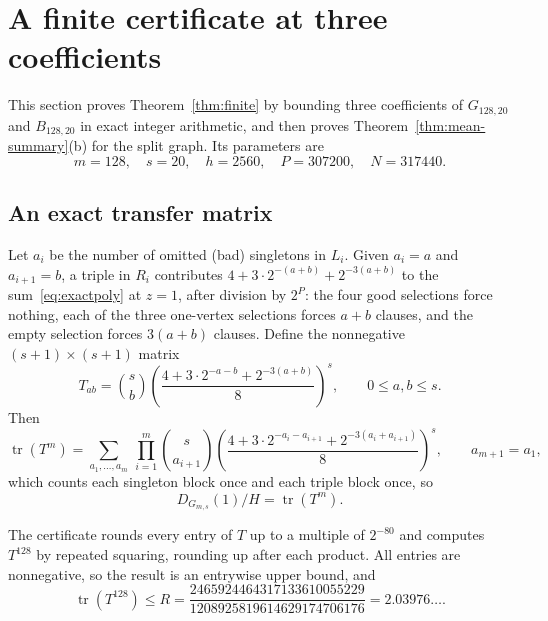 \documentclass[11pt,a4paper]{article}
\theoremstyle{definition}
\theoremstyle{remark}
\newcommand{\tr}{\operatorname{tr}}
\begin{document}
\section{A finite certificate at three coefficients}\label{sec:certificate}
This section proves Theorem~\ref{thm:finite} by bounding three coefficients of $G_{128,20}$ and $B_{128,20}$ in exact integer arithmetic, and then proves Theorem~\ref{thm:mean-summary}(b) for the split graph. Its parameters are
\[
m=128,\quad s=20,\quad h=2560,\quad P=307200,\quad N=317440.
\]

\subsection{An exact transfer matrix}
Let $a_i$ be the number of omitted (bad) singletons in $L_i$. Given $a_i=a$ and $a_{i+1}=b$, a triple in $R_i$ contributes $4+3\cdot2^{-(a+b)}+2^{-3(a+b)}$ to the sum~\eqref{eq:exactpoly} at $z=1$, after division by $2^P$: the four good selections force nothing, each of the three one-vertex selections forces $a+b$ clauses, and the empty selection forces $3(a+b)$ clauses. Define the nonnegative $(s+1)\times(s+1)$ matrix
\begin{equation}\label{eq:T}
T_{ab}=\binom{s}{b}
\left(\frac{4+3\cdot2^{-a-b}+2^{-3(a+b)}}{8}\right)^s,
\qquad 0\le a,b\le s .
\end{equation}
Then
\[
\tr(T^m)=\sum_{a_1,\dots,a_m}\ \prod_{i=1}^m\binom{s}{a_{i+1}}\left(\frac{4+3\cdot2^{-a_i-a_{i+1}}+2^{-3(a_i+a_{i+1})}}{8}\right)^s,\qquad a_{m+1}=a_1,
\]
which counts each singleton block once and each triple block once, so
\begin{equation}\label{eq:trace}
D_{G_{m,s}}(1)/H=\tr(T^m).
\end{equation}

The certificate rounds every entry of $T$ up to a multiple of $2^{-80}$ and computes $T^{128}$ by repeated squaring, rounding up after each product. All entries are nonnegative, so the result is an entrywise upper bound, and
\begin{equation}\label{eq:tracebound}
\tr(T^{128})\le
R=\frac{2465924464317133610055229}
{1208925819614629174706176}=2.03976\ldots .
\end{equation}
\end{document}
